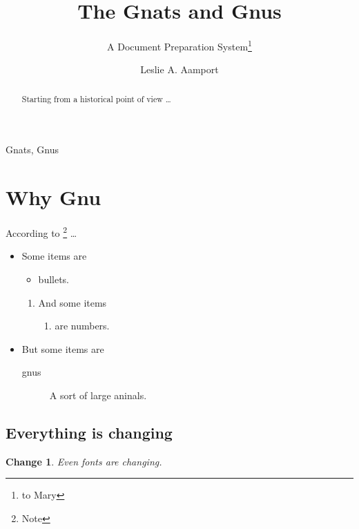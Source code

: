 
\author{Leslie A. Aamport}
\title{The Gnats and Gnus}
\subtitle{A Document Preparation System\thanks{to Mary}}

\maketitle

\begin{keywords}
Gnats, Gnus
\end{keywords}

\begin{abstract}
Starting from a historical point of view \dots
\end{abstract}

\smalltableofcontents

\section{Why Gnu}

According to \cite{book-full}\footnote{Note} \dots

\begin{itemize}
\item Some items are 
  \begin{itemize}
  \item bullets.
  \end{itemize}
  \begin{enumerate}
  \item And some items 
    \begin{enumerate}
    \item are numbers.
    \end{enumerate}
  \end{enumerate}
\item But some items are
  \begin{description}
  \item[gnus] A sort of large aninals.
  \end{description}
\end{itemize}


\subsection{Everything is changing}

\newtheorem{change}{Change}

\begin{change}
  Even fonts are changing.
\end{change}

